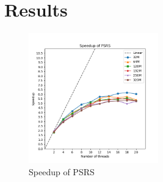 \documentclass[11pt]{article}
\begin{document}
    \section{Results}
    \label{sec:section-3}

    \begin{figure}[htbp]
        \centering
        \includegraphics[width=0.5\textwidth]{speedup.png}
        \caption{Speedup of PSRS}
        \label{fig:speedup}
    \end{figure}
\end{document}

